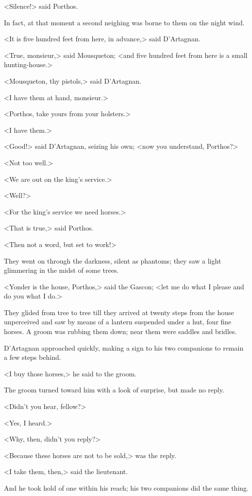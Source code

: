 <Silence!> said Porthos.

In fact, at that moment a second neighing was borne to them on the night wind.

<It is five hundred feet from here, in advance,> said D'Artagnan.

<True, monsieur,> said Mousqueton; <and five hundred feet from here is a small hunting-house.>

<Mousqueton, thy pistols,> said D'Artagnan.

<I have them at hand, monsieur.>

<Porthos, take yours from your holsters.>

<I have them.>

<Good!> said D'Artagnan, seizing his own; <now you understand, Porthos?>

<Not too well.>

<We are out on the king's service.>

<Well?>

<For the king's service we need horses.>

<That is true,> said Porthos.

<Then not a word, but set to work!>

They went on through the darkness, silent as phantoms; they saw a light glimmering in the midst of some trees.

<Yonder is the house, Porthos,> said the Gascon; <let me do what I please and do you what I do.>

They glided from tree to tree till they arrived at twenty steps from the house unperceived and saw by means of a lantern suspended under a hut, four fine horses. A groom was rubbing them down; near them were saddles and bridles.

D'Artagnan approached quickly, making a sign to his two companions to remain a few steps behind.

<I buy those horses,> he said to the groom.

The groom turned toward him with a look of surprise, but made no reply.

<Didn't you hear, fellow?>

<Yes, I heard.>

<Why, then, didn't you reply?>

<Because these horses are not to be sold,> was the reply.

<I take them, then,> said the lieutenant.

And he took hold of one within his reach; his two companions did the same thing.


